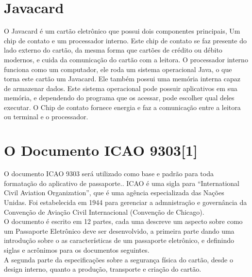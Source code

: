 \documentclass{article}
\begin{document}
    
	\section{Javacard\cite{JAVACHEN}}
		\begin{flushleft}
			

				\hspace{2cm} O Javacard é um cartão eletrônico que possui dois componentes principais, Um chip de contato e um processador interno. Este chip de contato se faz presente do lado externo do cartão, da mesma forma que cartões de crédito ou débito modernos, e cuida da comunicação do cartão com a leitora. O processador interno funciona como um computador, ele roda um sistema operacional Java, o que torna este cartão um Javacard. Ele também possui uma memória interna capaz de armazenar dados. Este sistema operacional pode possuir aplicativos em sua memória, e dependendo do programa que os acessar, pode escolher qual deles executar. O Chip de contato fornece energia e faz a comunicação entre a leitora ou terminal e o processador.

			
		\end{flushleft}

    
	\section{O Documento ICAO 9303[1]}
		\begin{flushleft}
			
				\hspace{2cm} O documento ICAO 9303 será utilizado como base e padrão para toda formatação do aplicativo de passaporte.. ICAO é uma sigla para “International Civil Aviation Organization”, que é uma agência especializada das Nações Unidas. Foi estabelecida em 1944 para gerenciar a admnistração e governância da Convenção de Aviação Civil Internacional (Convenção de Chicago). \\
    			\hspace{2cm} O documento é escrito em 12 partes, cada uma descreve um aspecto sobre como um Passaporte Eletrônico deve ser desenvolvido, a primeira parte dando uma introdução sobre o as características de um passaporte eletrônico, e definindo siglas e acrônimos para os documentos seguintes.\\
    			\hspace{2cm} A segunda parte da especificações sobre a segurança física do cartão, desde o design interno, quanto a produção, transporte e criação do cartão. 


			
		\end{flushleft}
\end{document}
